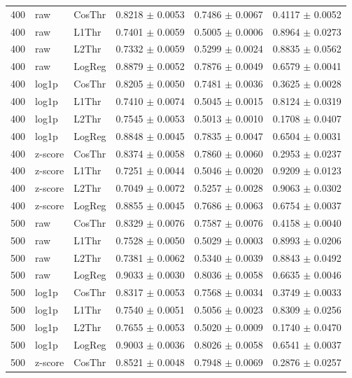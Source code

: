\begin{longtable}{rllccc}
400 & raw & CosThr & 0.8218 $\pm$ 0.0053 & 0.7486 $\pm$ 0.0067 & 0.4117 $\pm$ 0.0052 \\
400 & raw & L1Thr & 0.7401 $\pm$ 0.0059 & 0.5005 $\pm$ 0.0006 & 0.8964 $\pm$ 0.0273 \\
400 & raw & L2Thr & 0.7332 $\pm$ 0.0059 & 0.5299 $\pm$ 0.0024 & 0.8835 $\pm$ 0.0562 \\
400 & raw & LogReg & 0.8879 $\pm$ 0.0052 & 0.7876 $\pm$ 0.0049 & 0.6579 $\pm$ 0.0041 \\
400 & log1p & CosThr & 0.8205 $\pm$ 0.0050 & 0.7481 $\pm$ 0.0036 & 0.3625 $\pm$ 0.0028 \\
400 & log1p & L1Thr & 0.7410 $\pm$ 0.0074 & 0.5045 $\pm$ 0.0015 & 0.8124 $\pm$ 0.0319 \\
400 & log1p & L2Thr & 0.7545 $\pm$ 0.0053 & 0.5013 $\pm$ 0.0010 & 0.1708 $\pm$ 0.0407 \\
400 & log1p & LogReg & 0.8848 $\pm$ 0.0045 & 0.7835 $\pm$ 0.0047 & 0.6504 $\pm$ 0.0031 \\
400 & z-score & CosThr & 0.8374 $\pm$ 0.0058 & 0.7860 $\pm$ 0.0060 & 0.2953 $\pm$ 0.0237 \\
400 & z-score & L1Thr & 0.7251 $\pm$ 0.0044 & 0.5046 $\pm$ 0.0020 & 0.9209 $\pm$ 0.0123 \\
400 & z-score & L2Thr & 0.7049 $\pm$ 0.0072 & 0.5257 $\pm$ 0.0028 & 0.9063 $\pm$ 0.0302 \\
400 & z-score & LogReg & 0.8855 $\pm$ 0.0045 & 0.7686 $\pm$ 0.0063 & 0.6754 $\pm$ 0.0037 \\
500 & raw & CosThr & 0.8329 $\pm$ 0.0076 & 0.7587 $\pm$ 0.0076 & 0.4158 $\pm$ 0.0040 \\
500 & raw & L1Thr & 0.7528 $\pm$ 0.0050 & 0.5029 $\pm$ 0.0003 & 0.8993 $\pm$ 0.0206 \\
500 & raw & L2Thr & 0.7381 $\pm$ 0.0062 & 0.5340 $\pm$ 0.0039 & 0.8843 $\pm$ 0.0492 \\
500 & raw & LogReg & 0.9033 $\pm$ 0.0030 & 0.8036 $\pm$ 0.0058 & 0.6635 $\pm$ 0.0046 \\
500 & log1p & CosThr & 0.8317 $\pm$ 0.0053 & 0.7568 $\pm$ 0.0034 & 0.3749 $\pm$ 0.0033 \\
500 & log1p & L1Thr & 0.7540 $\pm$ 0.0051 & 0.5056 $\pm$ 0.0023 & 0.8309 $\pm$ 0.0256 \\
500 & log1p & L2Thr & 0.7655 $\pm$ 0.0053 & 0.5020 $\pm$ 0.0009 & 0.1740 $\pm$ 0.0470 \\
500 & log1p & LogReg & 0.9003 $\pm$ 0.0036 & 0.8026 $\pm$ 0.0058 & 0.6541 $\pm$ 0.0037 \\
500 & z-score & CosThr & 0.8521 $\pm$ 0.0048 & 0.7948 $\pm$ 0.0069 & 0.2876 $\pm$ 0.0257 \\

\end{longtable}
